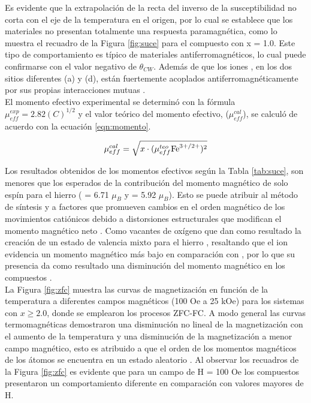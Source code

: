 Es evidente que la extrapolación de la recta del inverso de la susceptibilidad
no corta con el eje de la temperatura en el origen, por lo cual se establece
que los materiales no presentan totalmente una respuesta paramagnética, como lo
muestra el recuadro de la Figura \ref{fig:suce} para el compuesto con x = 1.0. Este
tipo de
comportamiento es típico de materiales antiferromagnéticos, lo cual puede
confirmarse con el valor negativo de $\theta_{CW}$. Además de que los iones
, en los
dos sitios diferentes (a) y (d), están fuertemente acoplados
antiferromagnéticamente por sus propias interacciones mutuas \cite{guillot1977magnetic}.\\

El momento efectivo experimental se determinó con la fórmula
$\mu_{eff}^{exp}=2.82(C)^{1/2}$ y el valor teórico del momento efectivo,
($\mu_{eff}^{cal}$), se calculó de acuerdo con la ecuación \ref{eqn:momento}.

\begin{equation}
  \mu_{eff}^{cal}=\sqrt{x\cdot (\mu_{eff}^{teo} \ce{Fe^{3+/2+}})^2}
  \label{eqn:momento}
\end{equation}

Los resultados obtenidos de los momentos efectivos según la Tabla \ref{tab:suce}, son
menores que los esperados de la contribución del momento magnético de solo
espín para el hierro ( = 6.71 $\mu_{B}$ y  = 5.92
$\mu_B$). Esto se puede atribuir
al método de síntesis y a factores que promueven cambios en el orden magnético
de los movimientos catiónicos debido a distorsiones estructurales que modifican
el momento magnético neto \cite{banos2018enhancement}. Como vacantes de oxígeno que dan como
resultado
la creación de un estado de valencia mixto para el hierro ,
resaltando que el ion  evidencia un momento magnético más bajo en
comparación con , por lo que su presencia da como resultado una
disminución
del momento magnético en los compuestos \cite{hussain2019growth}.\\

La Figura \ref{fig:zfc} muestra las curvas de magnetización en función de la
temperatura a
diferentes campos magnéticos (100 Oe a 25 kOe) para los sistemas con $x \geq
  2.0$,
donde se emplearon los procesos ZFC-FC. A modo general las curvas
termomagnéticas demostraron una disminución no lineal de la magnetización con
el aumento de la temperatura y una disminución de la magnetización a menor
campo magnético, esto es atribuido a que el orden de los momentos magnéticos de
los átomos se encuentra en un estado aleatorio \cite{ramesh20173}. Al observar los
recuadros de la Figura \ref{fig:zfc}
es evidente que para un campo de H = 100 Oe los compuestos presentaron un
comportamiento
diferente en comparación con valores mayores de H.\\

